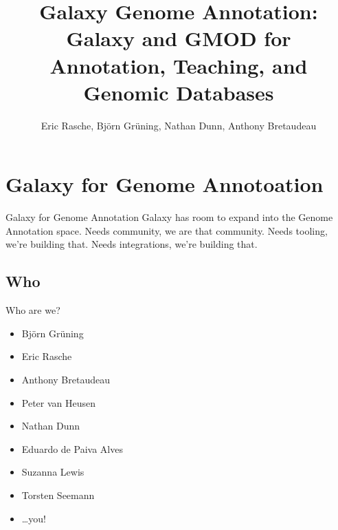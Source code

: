 \documentclass[12pt]{phage3slides} %
\title[Galaxy for Genome Annotation]{Galaxy Genome Annotation: Galaxy and GMOD for Annotation, Teaching, and Genomic Databases}
\author[ER, BG, ND, AB]{Eric Rasche, Bj\"orn Gr\"uning, Nathan Dunn, Anthony Bretaudeau}
\begin{document}
\frame{\titlepage}




\section[GGA]{Galaxy for Genome Annotoation}
\begin{frame}{Galaxy for Genome Annotation}
    Galaxy has room to expand into the Genome Annotation space.
    Needs community, we are that community.
    Needs tooling, we're building that.
    Needs integrations, we're building that.
\end{frame}

\subsection{Who}
\begin{frame}{Who are we?}
    \begin{itemize}
        \item Bj\"orn Gr\"uning
        \item Eric Rasche
        \item Anthony Bretaudeau
        \item Peter van Heusen
        \item Nathan Dunn
        \item Eduardo de Paiva Alves
        \item Suzanna Lewis
        \item Torsten Seemann
        \item \ldots you!
    \end{itemize}
\end{frame}
\end{document}
